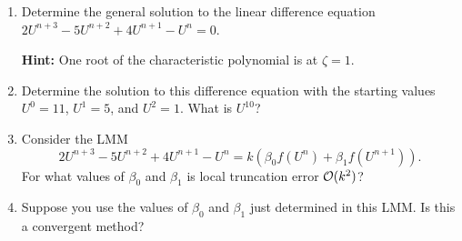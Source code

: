 

\begin{enumerate}
\item Determine the general solution to the linear difference equation 
$2U^{n+3} - 5U^{n+2} + 4U^{n+1} - U^n = 0$.

{\bf Hint:} One root of the characteristic polynomial is at $\zeta=1$.

\item Determine the solution to this difference equation with the starting
values $U^0=11$, $U^1=5$, and $U^2=1$.  What is $U^{10}$?

\item Consider the LMM
\[
2U^{n+3} - 5U^{n+2} + 4U^{n+1} - U^n = k(\beta_0 f(U^n) + \beta_1 f(U^{n+1})).
\]
For what values of $\beta_0$ and $\beta_1$ is local truncation error
${\mathcal O}(k^2)$?

\item Suppose you use the values of $\beta_0$ and $\beta_1$ just determined
in this LMM.  Is this a convergent method?

\end{enumerate} 

